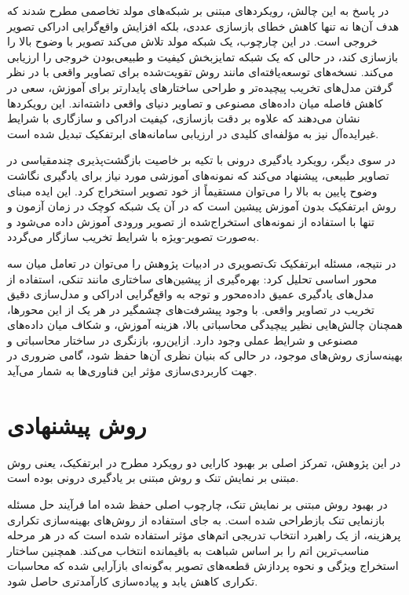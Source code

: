 در پاسخ به این چالش، رویکردهای مبتنی بر شبکه‌های مولد تخاصمی مطرح شدند که هدف آن‌ها نه تنها کاهش خطای بازسازی عددی، بلکه افزایش واقع‌گرایی ادراکی تصویر خروجی است. در این چارچوب، یک شبکه مولد تلاش می‌کند تصویر با وضوح بالا را بازسازی کند، در حالی که یک شبکه تمایزبخش کیفیت و طبیعی‌بودن خروجی را ارزیابی می‌کند. نسخه‌های توسعه‌یافته‌ای مانند روش تقویت‌شده برای تصاویر واقعی با در نظر گرفتن مدل‌های تخریب پیچیده‌تر و طراحی ساختارهای پایدارتر برای آموزش، سعی در کاهش فاصله میان داده‌های مصنوعی و تصاویر دنیای واقعی داشته‌اند. این رویکردها نشان می‌دهند که علاوه بر دقت بازسازی، کیفیت ادراکی و سازگاری با شرایط غیرایده‌آل نیز به مؤلفه‌ای کلیدی در ارزیابی سامانه‌های ابرتفکیک تبدیل شده است.

در سوی دیگر، رویکرد یادگیری درونی با تکیه بر خاصیت بازگشت‌پذیری چندمقیاسی در تصاویر طبیعی، پیشنهاد می‌کند که نمونه‌های آموزشی مورد نیاز برای یادگیری نگاشت وضوح پایین به بالا را می‌توان مستقیماً از خود تصویر استخراج کرد. این ایده مبنای روش ابرتفکیک بدون آموزش پیشین است که در آن یک شبکه کوچک در زمان آزمون و تنها با استفاده از نمونه‌های استخراج‌شده از تصویر ورودی آموزش داده می‌شود و به‌صورت تصویر-ویژه با شرایط تخریب سازگار می‌گردد.

در نتیجه، مسئله ابرتفکیک تک‌تصویری در ادبیات پژوهش را می‌توان در تعامل میان سه محور اساسی تحلیل کرد: بهره‌گیری از پیشین‌های ساختاری مانند تنکی، استفاده از مدل‌های یادگیری عمیق داده‌محور و توجه به واقع‌گرایی ادراکی و مدل‌سازی دقیق تخریب در تصاویر واقعی. با وجود پیشرفت‌های چشمگیر در هر یک از این محورها، همچنان چالش‌هایی نظیر پیچیدگی محاسباتی بالا، هزینه آموزش، و شکاف میان داده‌های مصنوعی و شرایط عملی وجود دارد. ازاین‌رو، بازنگری در ساختار محاسباتی و بهینه‌سازی روش‌های موجود، در حالی که بنیان نظری آن‌ها حفظ شود، گامی ضروری در جهت کاربردی‌سازی مؤثر این فناوری‌ها به شمار می‌آید.

\section{روش پیشنهادی}

در این پژوهش، تمرکز اصلی بر بهبود کارایی دو رویکرد مطرح در ابرتفکیک، یعنی روش مبتنی بر نمایش تنک و روش مبتنی بر یادگیری درونی بوده است.

در بهبود روش مبتنی بر نمایش تنک، چارچوب اصلی حفظ شده اما فرآیند حل مسئله بازنمایی تنک بازطراحی شده است. به جای استفاده از روش‌های بهینه‌سازی تکراری پرهزینه، از یک راهبرد انتخاب تدریجی اتم‌های مؤثر استفاده شده است که در هر مرحله مناسب‌ترین اتم را بر اساس شباهت به باقیمانده انتخاب می‌کند. همچنین ساختار استخراج ویژگی و نحوه پردازش قطعه‌های تصویر به‌گونه‌ای بازآرایی شده که محاسبات تکراری کاهش یابد و پیاده‌سازی کارآمدتری حاصل شود.

